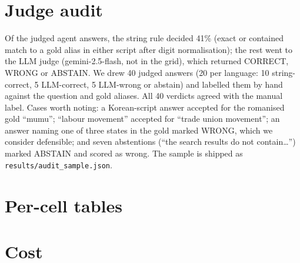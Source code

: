 \section{Judge audit}
\label{app:audit}
Of the judged agent answers, the string rule decided 41\% (exact or contained match to a gold alias in either script after digit normalisation); the rest went to the LLM judge (gemini-2.5-flash, not in the grid), which returned CORRECT, WRONG or ABSTAIN. We drew 40 judged answers (20 per language: 10 string-correct, 5 LLM-correct, 5 LLM-wrong or abstain) and labelled them by hand against the question and gold aliases. All 40 verdicts agreed with the manual label. Cases worth noting: a Korean-script answer accepted for the romanised gold ``mumu''; ``labour movement'' accepted for ``trade union movement''; an answer naming one of three states in the gold marked WRONG, which we consider defensible; and seven abstentions (``the search results do not contain\ldots'') marked ABSTAIN and scored as wrong. The sample is shipped as \texttt{results/audit\_sample.json}.
\section{Per-cell tables}
\label{app:cells}

\section{Cost}
\label{app:cost}

